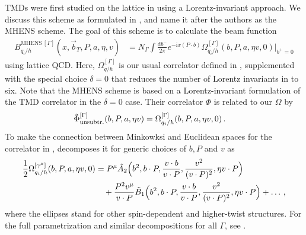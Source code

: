 \documentclass[11pt,a4paper]{article}
\newcommand{\df}{\mathrm{d}}
\newcommand{\img}{\mathrm{i}}
\newcommand{\nn}{\nonumber}
\newcommand{\bt}{\vec b_T}
\newcommand{\Corr}{\Omega}
\newcommand{\q}{q_i}
\begin{document}
TMDs were first studied on the lattice in 
using a Lorentz-invariant approach.
 We discuss this scheme as formulated in ,
and name it after the authors as the MHENS scheme.
%
The goal of this scheme is to calculate the beam function
\begin{align}\label{eq:beam_MHENS}
 B_{\q/h}^{\mathrm{MHENS}~[\Gamma]}(x, \bt, P, a, \eta, v) &
 = N_\Gamma \int\frac{\df b^-}{2 \pi} e^{-\img x (P \cdot b)} \Corr_{\q/h}^{[\Gamma]}(b, P, a, \eta v, 0) \bigg|_{b^+ = 0}
\end{align}
using lattice QCD. Here, $\Corr_{q/h}^{[\Gamma]}$ is our usual correlator defined in ,
supplemented with the special choice $\delta = 0$ that reduces the number of Lorentz invariants
in  to six.
Note that the MHENS scheme is based on a Lorentz-invariant formulation of the TMD correlator in the $\delta=0$ case. Their correlator $\Phi$ is related to our $\Corr$ by
\begin{align}
 \tilde\Phi^{[\Gamma]}_{\rm unsubtr.}(b, P, a, \eta v) &
 = \Corr_{\q/h}^{[\Gamma]}(b, P, a, \eta v, 0)
\,.
\end{align}
To make the connection between Minkowksi and Euclidean spaces
for the correlator in ,  decomposes it
for generic choices of $b, P$ and $v$ as
\begin{align} \label{eq:MHENS_decomposition}
 \frac12 \Corr_{\q/h}^{[\gamma^\mu]}(b, P, a, \eta v, 0) &
 = P^\mu \tilde A_2\Bigl(b^2, b \cdot P, \frac{v \cdot b}{v \cdot P}, \frac{v^2}{(v \cdot P)^2}, \eta v \cdot P\Bigr)
 \nn\\&\quad
 + \frac{P^2 v^\mu}{v \cdot P} \tilde B_1 \Bigl(b^2, b \cdot P, \frac{v \cdot b}{v \cdot P}, \frac{v^2}{(v \cdot P)^2}, \eta v \cdot P\Bigr) + \ldots
\,,\end{align}
where the ellipses stand for other spin-dependent and higher-twist structures.
For the full parametrization and similar decompositions for all $\Gamma$, see .
\end{document}
